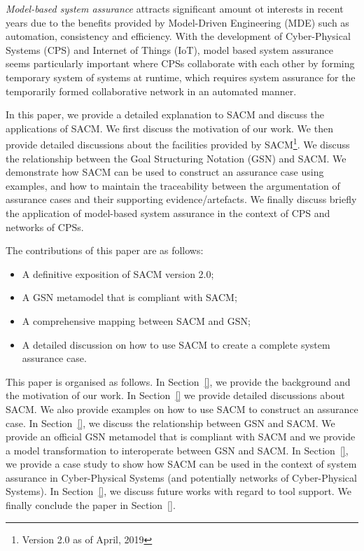 \textit{Model-based system assurance} attracts significant amount ot interests in recent years due to the benefits provided by Model-Driven Engineering (MDE) such as automation, consistency and efficiency. With the development of Cyber-Physical Systems (CPS) and Internet of Things (IoT), model based system assurance seems particularly important where CPSs collaborate with each other by forming temporary system of systems at runtime, which requires system assurance for the temporarily formed collaborative network in an automated manner.


In this paper, we provide a detailed explanation to SACM and discuss the applications of SACM. We first discuss the motivation of our work.  We then provide detailed discussions about the facilities provided by SACM\footnote{Version 2.0 as of April, 2019}. We discuss the relationship between the Goal Structuring Notation (GSN) and SACM. We demonstrate how SACM can be used to construct an assurance case using examples, and how to maintain the traceability between the argumentation of assurance cases and their supporting evidence/artefacts. We finally discuss briefly the application of model-based system assurance in the context of CPS and networks of CPSs.

The contributions of this paper are as follows:
\begin{itemize}
	\item A definitive exposition of SACM version 2.0;
	\item A GSN metamodel that is compliant with SACM;
	\item A comprehensive mapping between SACM and GSN;
	\item A detailed discussion on how to use SACM to create a complete system assurance case.
\end{itemize}

This paper is organised as follows. In Section~\ref{}, we provide the background and the motivation of our work. In Section~\ref{} we provide detailed discussions about SACM. We also provide examples on how to use SACM to construct an assurance case. In Section~\ref{}, we discuss the relationship between GSN and SACM. We provide an official GSN metamodel that is compliant with SACM and we provide a model transformation to interoperate between GSN and SACM. In Section~\ref{}, we provide a case study to show how SACM can be used in the context of system assurance in Cyber-Physical Systems (and potentially networks of Cyber-Physical Systems). In Section~\ref{}, we discuss future works with regard to tool support. We finally conclude the paper in Section~\ref{}.

